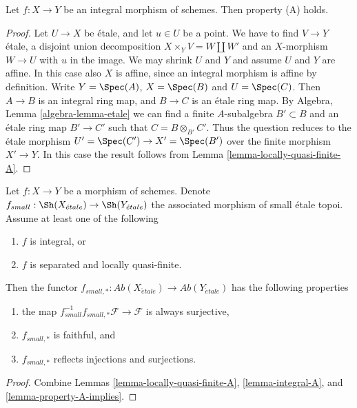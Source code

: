 \begin{lemma}
\label{lemma-integral-A}
Let $f : X \to Y$ be an integral morphism of schemes.
Then property (A) holds.
\end{lemma}

\begin{proof}
Let $U \to X$ be \'etale, and let $u \in U$ be a point.
We have to find $V \to Y$ \'etale, a disjoint union decomposition
$X \times_Y V = W \amalg W'$ and an $X$-morphism $W \to U$
with $u$ in the image. We may shrink $U$ and $Y$ and assume
$U$ and $Y$ are affine. In this case also $X$ is affine, since
an integral morphism is affine by definition. Write $Y = \Spec(A)$,
$X = \Spec(B)$ and $U = \Spec(C)$. Then $A \to B$ is an
integral ring map, and $B \to C$ is an \'etale ring map. By
Algebra, Lemma \ref{algebra-lemma-etale}
we can find a finite $A$-subalgebra $B' \subset B$ and an \'etale ring
map $B' \to C'$ such that $C = B \otimes_{B'} C'$. Thus the question
reduces to the \'etale morphism
$U' = \Spec(C') \to X' = \Spec(B')$
over the finite morphism $X' \to Y$. In this case the result follows from
Lemma \ref{lemma-locally-quasi-finite-A}.
\end{proof}

\begin{lemma}
\label{lemma-when-push-pull-surjective}
Let $f : X \to Y$ be a morphism of schemes. Denote
$f_{small} :
\Sh(X_{\acute{e}tale})
\to
\Sh(Y_{\acute{e}tale})$
the associated morphism of small \'etale topoi. Assume at least one
of the following
\begin{enumerate}
\item $f$ is integral, or
\item $f$ is separated and locally quasi-finite.
\end{enumerate}
Then the functor
$f_{small, *} :
\textit{Ab}(X_{\acute{e}tale})
\to
\textit{Ab}(Y_{\acute{e}tale})$
has the following properties
\begin{enumerate}
\item the map
$f_{small}^{-1}f_{small, *}\mathcal{F} \to \mathcal{F}$
is always surjective,
\item $f_{small, *}$ is faithful, and
\item $f_{small, *}$ reflects injections and surjections.
\end{enumerate}
\end{lemma}

\begin{proof}
Combine
Lemmas \ref{lemma-locally-quasi-finite-A},
\ref{lemma-integral-A}, and
\ref{lemma-property-A-implies}.
\end{proof}



